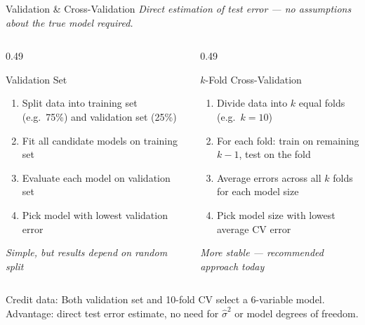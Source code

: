 \documentclass[ignorenonframetext,]{beamer}
\begin{document}
\begin{frame}{Validation \& Cross-Validation}
\emph{Direct estimation of test error --- no assumptions about the true model required.}

\begin{columns}[T]
\begin{column}{0.49\textwidth}
\begin{block}{\small Validation Set}
\scriptsize
\begin{enumerate}
	\item Split data into training set (e.g.\ 75\%) and validation set (25\%)
	\item Fit all candidate models on training set
	\item Evaluate each model on validation set
	\item Pick model with lowest validation error
\end{enumerate}
\emph{Simple, but results depend on random split}
\end{block}
\end{column}
\begin{column}{0.49\textwidth}
\begin{exampleblock}{\small $k$-Fold Cross-Validation}
\scriptsize
\begin{enumerate}
	\item Divide data into $k$ equal folds (e.g.\ $k = 10$)
	\item For each fold: train on remaining $k-1$, test on the fold
	\item Average errors across all $k$ folds for each model size
	\item Pick model size with lowest average CV error
\end{enumerate}
\emph{More stable --- recommended approach today}
\end{exampleblock}
\end{column}
\end{columns}

\vspace{4pt}
{\footnotesize
Credit data: Both validation set and 10-fold CV select a 6-variable model.\\
Advantage: direct test error estimate, no need for $\hat{\sigma}^2$ or model degrees of freedom.}
\end{frame}
\end{document}
